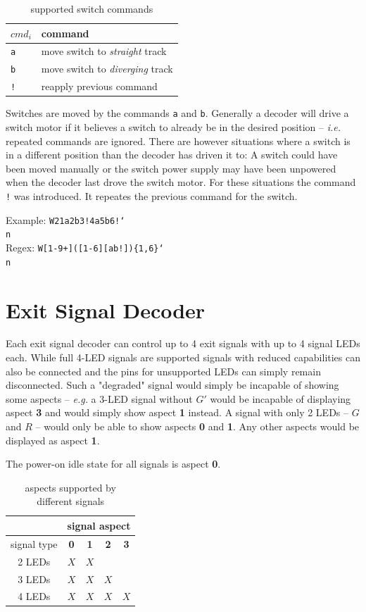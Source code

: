 \documentclass{scrreprt}
\newcommand\n{\char`\\n}
\newcommand\ie{\emph{i.e. }}
\newcommand\eg{\emph{e.g. }}
\begin{document}
\begin{table}[ht!]
\centering
\begin{tabular}{ |l|l| }
\hline
$cmd_i$ & command \\\hline\hline
\texttt{a} & move switch to \emph{straight} track \\\hline
\texttt{b} & move switch to \emph{diverging} track \\\hline
\texttt{!} & reapply previous command \\\hline
\end{tabular}
\caption{supported switch commands}
\end{table}

Switches are moved by the commands \texttt{a} and \texttt{b}.
Generally a decoder will drive a switch motor if it believes a switch to already be in the desired position
-- \ie repeated commands are ignored.
There are however situations where a switch is in a different position than the decoder has driven it to:
A switch could have been moved manually or the switch power supply may have been unpowered when the decoder last drove the switch motor.
For these situations the command \texttt{!} was introduced. It repeates the previous command for the switch.

Example: \texttt{W21a2b3!4a5b6!\n} \\
Regex: \texttt{W[1-9+]([1-6][ab!])\{1,6\}\n}

\section{Exit Signal Decoder}
Each exit signal decoder can control up to 4 exit signals with up to 4 signal LEDs each.
While full 4-LED signals are supported signals with reduced capabilities can also be connected and the pins for unsupported LEDs can simply remain disconnected.
Such a "degraded" signal would simply be incapable of showing some aspects -- \eg a 3-LED signal without $G'$ would be incapable of displaying aspect \textbf{3} and would simply show aspect \textbf{1} instead.
A signal with only 2 LEDs -- $G$ and $R$ -- would only be able to show aspects \textbf{0} and \textbf{1}.
Any other aspects would be displayed as aspect \textbf{1}.

The power-on idle state for all signals is aspect \textbf{0}.

\begin{table}[ht!]
\centering
\begin{tabular} { |c||c|c|c|c| }
\hline
& \multicolumn{4}{|c|}{signal aspect} \\\hline
signal type & \textbf{0} & \textbf{1} & \textbf{2} & \textbf{3} \\\hline\hline
2 LEDs & $X$ & $X$ &     &     \\\hline
3 LEDs & $X$ & $X$ & $X$ &     \\\hline
4 LEDs & $X$ & $X$ & $X$ & $X$ \\\hline
\end{tabular}
\caption{aspects supported by different signals}
\end{table}
\end{document}
